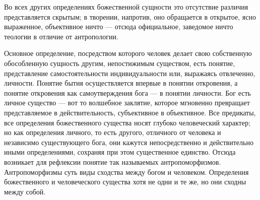\documentclass[12pt,oneside]{book}
\begin{document}
Во всех других определениях божественной сущности это отсутствие различия представляется скрытым; в творении, напротив, оно обращается в открытое, ясно выраженное, объективное ничто --- отсюда официальное, заведомое ничто теологии в отличие от антропологии.

Основное определение, посредством которого человек делает свою собственную обособленную сущность другим, непостижимым существом, есть понятие, представление самостоятельности индивидуальности или, выражаясь отвлеченно, личности. Понятие бытия осуществляется впервые в понятии откровения, а понятие откровения как самоутверждения бога --- в понятии личности. Бог есть личное существо --- вот то волшебное заклятие, которое мгновенно превращает представляемое в действительность, субъективное в объективное. Все предикаты, все определения божественного существа носят глубоко человеческий характер; но как определения личного, то есть другого, отличного от человека и независимо существующего бога, они кажутся непосредственно и действительно иными определениями, сохраняя при этом существенное единство. Отсюда возникает для рефлексии понятие так называемых антропоморфизмов. Антропоморфизмы суть виды сходства между богом и человеком. Определения божественного и человеческого существа хотя не одни и те же, но они сходны между собой.
\end{document}
